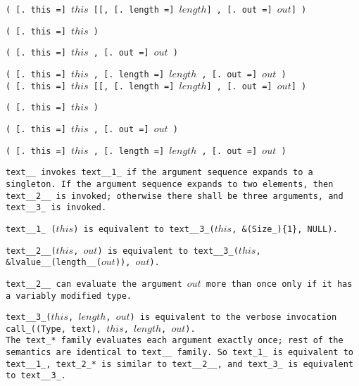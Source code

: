 
\s\s\s\s\tt{(} [\tt{. this =}] $this$ [[\tt{,}
[\tt{. length =}] $length$] \tt{,} [\tt{. out =}] $out$] \tt{)}

\s\s\tt{(} [\tt{. this =}] $this$ \tt{)}

\s\tt{(}  [\tt{. this =}] $this$
\phantom{[[}\tt{,} [\tt{. out =}] $out$ \tt{)}

\s\s\tt{(} [\tt{. this =}] $this$ \phantom{[[}\tt{,}
[\tt{. length =}] $length$\phantom{]} \tt{,} [\tt{. out =}] $out$\phantom{]} \tt{)}\\

\s\s\s\s\s\tt{(} [\tt{. this =}] $this$ [[\tt{,}
[\tt{. length =}] $length$] \tt{,} [\tt{. out =}] $out$] \tt{)}

\s\s\s\tt{(} [\tt{. this =}] $this$ \tt{)}

\s\s\s\tt{(} [\tt{. this =}] $this$
\phantom{[[}\tt{,} [\tt{. out =}] $out$ \tt{)}

\s\s\s\tt{(} [\tt{. this =}] $this$ \phantom{[[}\tt{,}
[\tt{. length =}] $length$\phantom{]} \tt{,} [\tt{. out =}] $out$\phantom{]} \tt{)}


\tt{text__} invokes \tt{text__1_} if the argument sequence expands to a singleton.
If the argument sequence expands to two elements, then \tt{text__2__} is invoked;
otherwise there shall be three arguments, and \tt{text__3_} is invoked.

\tt{text__1_ (}$this$\tt{)} is equivalent to
\tt{text__3_(}$this$\tt{, &(Size_)\{1\}, NULL)}.

\tt{text__2__(}$this$\tt{,} $out$\tt{)} is equivalent to
\tt{text__3_(}$this$\tt{, &lvalue__(length__(}$out$\tt{)),} $out$\tt{)}.

\tt{text__2__} can evaluate the argument $out$ more
than once only if it has a variably modified type.

\tt{text__3_(}$this$\tt{,} $length$\tt{,} $out$\tt{)} is equivalent to the verbose
invocation \tt{call_((Type, text),}  $this$\tt{,} $length$\tt{,} $out$\tt{)}.\\

The \tt{text_}* family evaluates each argument exactly once;
rest of the semantics are identical to \tt{text__} family.
So \tt{text_1_} is equivalent to \tt{text__1_}, \tt{text_2_}* is similar
to \tt{text__2__}, and \tt{text_3_} is equivalent to \tt{text__3_}.

